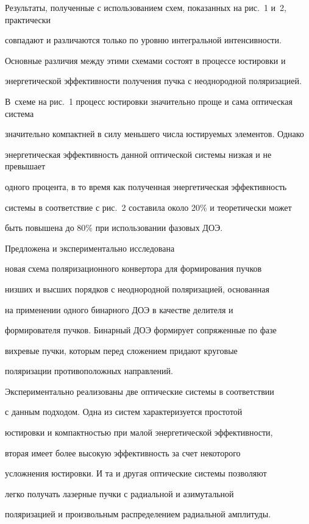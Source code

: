 Результаты, полученные с использованием схем, показанных на рис.~1 и~2, практически

совпадают и различаются только по уровню интегральной интенсивности.

Основные различия между этими схемами состоят в процессе юстировки и

энергетической эффективности получения пучка с неоднородной поляризацией.

В~схеме на рис.~1 процесс юстировки значительно проще и сама оптическая система

значительно компактней в силу меньшего числа юстируемых элементов. Однако

энергетическая эффективность данной оптической системы низкая и не превышает

одного процента, в то время как полученная энергетическая эффективность

системы в соответствие с рис.~2 составила около 20{\%} и теоретически может

быть повышена до 80{\%} при использовании фазовых ДОЭ.



 Предложена и экспериментально исследована

новая схема поляризационного конвертора для формирования пучков

низших и высших порядков с неоднородной поляризацией, основанная

на применении одного бинарного ДОЭ в качестве делителя и

формирователя пучков. Бинарный ДОЭ формирует сопряженные по фазе

вихревые пучки, которым перед сложением придают круговые

поляризации противоположных направлений.



Экспериментально реализованы две оптические системы в соответствии

с данным подходом. Одна из систем характеризуется простотой

юстировки и компактностью при малой энергетической эффективности,

вторая имеет более высокую эффективность за счет некоторого

усложнения юстировки. И та и другая оптические системы позволяют

легко получать лазерные пучки с радиальной и азимутальной

поляризацией и произвольным распределением радиальной амплитуды.

